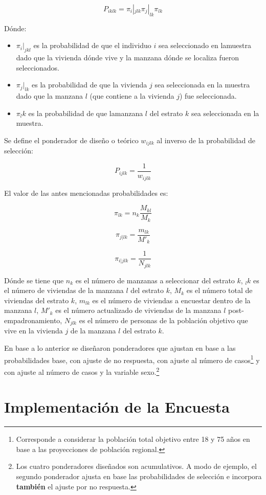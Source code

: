 \documentclass[
]{book}
\providecommand{\tightlist}{%
  \setlength{\itemsep}{0pt}\setlength{\parskip}{0pt}}
\begin{document}
\[P_{iklk} = \pi_i|_{jlk}\pi_j|_{lk}\pi_{lk}\]

Dónde:

\begin{itemize}
\tightlist
\item
  \(\pi_i|_{jkl}\) es la probabilidad de que el individuo \(i\) sea seleccionado en lamuestra dado que la vivienda dónde vive y la manzana dónde se localiza fueron seleccionados.
\item
  \(\pi_j|_{lk}\) es la probabilidad de que la vivienda \(j\) sea seleccionada en la muestra dado que la manzana \(l\) (que contiene a la vivienda \(j\)) fue seleccionada.
\item
  \(\pi_lk\) es la probabilidad de que lamanzana \(l\) del estrato \(k\) sea seleccionada en la muestra.
\end{itemize}

Se define el ponderador de diseño o teórico \(w_{ijlk}\) al inverso de la probabilidad de selección:

\[P_{ijlk}=\frac{1}{w_{ijlk}}\]

El valor de las antes mencionadas probabilidades es:

\[\pi_{lk} = n_k\frac{M_{kl}}{M_k}\]

\[\pi_{j|lk} = \frac{m_{lk}}{M'_k}\]

\[\pi_{i|jlk} = \frac{1}{N_{jlk}}\]

Dónde se tiene que \(n_k\) es el número de manzanas a seleccionar del estrato \(k\), \(_lk\) es el número de viviendas de la manzana \(l\) del estrato \(k\), \(M_k\) es el número total de viviendas del estrato \(k\), \(m_{lk}\) es el número de viviendas a encuestar dentro de la manzana \(l\), \(M'_k\) es el número actualizado de viviendas de la manzana \(l\) post-empadronamiento, \(N_{jlk}\) es el número de personas de la
población objetivo que vive en la vivienda \(j\) de la manzana \(l\) del estrato \(k\).

En base a lo anterior se diseñaron ponderadores que ajustan en base a las probabilidades base, con ajuste de no respuesta, con ajuste al número de casos\footnote{Corresponde a considerar la población total objetivo entre 18 y 75 años en base a las proyecciones de población
  regional.} y con ajuste al número de casos y la variable sexo.\footnote{Los cuatro ponderadores diseñados son acumulativos. A modo de ejemplo, el segundo ponderador ajusta en base las probabilidades de selección e incorpora \textbf{también} el ajuste por no respuesta.}

\hypertarget{implementaciuxf3n-de-la-encuesta}{%
\chapter{Implementación de la Encuesta}\label{implementaciuxf3n-de-la-encuesta}}
\end{document}
